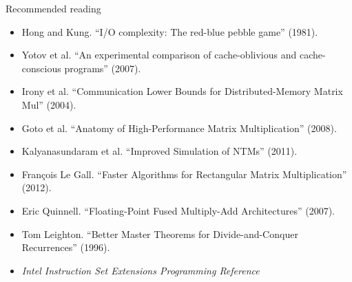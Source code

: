 \documentclass[mathserif,xcolor={dvipsnames,table}]{beamer}
\begin{document}
\begin{frame}{Recommended reading}
\tiny{
\begin{itemize}
\item Hong and Kung. ``I/O complexity: The red-blue pebble game'' (1981).
\item Yotov et al. ``An experimental comparison of cache-oblivious and cache-conscious programs'' (2007).
\item Irony et al. ``Communication Lower Bounds for Distributed-Memory Matrix Mul'' (2004).
\item Goto et al. ``Anatomy of High-Performance Matrix Multiplication'' (2008).
\item Kalyanasundaram et al. ``Improved Simulation of NTMs'' (2011).
\item Fran\c{c}ois Le Gall. ``Faster Algorithms for Rectangular Matrix Multiplication'' (2012).
\item Eric Quinnell. ``Floating-Point Fused Multiply-Add Architectures'' (2007).
\item Tom Leighton. ``Better Master Theorems for Divide-and-Conquer Recurrences'' (1996).
\item \textit{Intel Instruction Set Extensions Programming Reference}
\end{itemize}
}
\end{frame}

\end{document}

